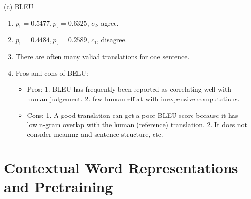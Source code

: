 (c) BLEU
\begin{enumerate}[label=(\roman*)]
	\item $p_1 = 0.5477, p_2 = 0.6325$, $c_2$, agree.
	\item $p_1 = 0.4484, p_2 = 0.2589$, $c_1$, disagree.
	\item There are often many valiad translations for one sentence.
	\item Pros and cons of BELU:
	\begin{itemize}
		\item Pros: 1. BLEU has frequently been reported as correlating well with human judgement. 2. few human effort with inexpensive computations.
		\item Cons: 1. A good translation can get a poor BLEU score because it has low n-gram overlap with the human (reference) translation. 2. It does not consider meaning and sentence structure, etc.
	\end{itemize}
\end{enumerate}

\section{Contextual Word Representations and Pretraining} \label{contextual_word_rep}